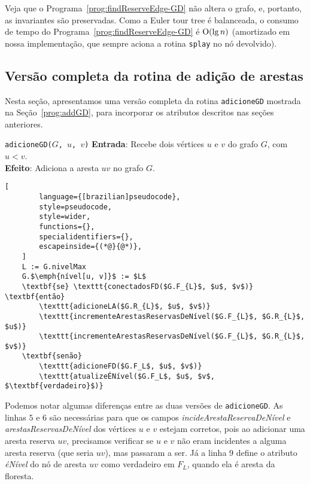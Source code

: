 Veja que o Programa~\ref{prog:findReserveEdge-GD} não altera o grafo, e, portanto, as invariantes são preservadas. Como a Euler tour tree é balanceada, o consumo de tempo do Programa~\ref{prog:findReserveEdge-GD} é $\mathrm{O}(\lg n)$ (amortizado em nossa implementação, que sempre aciona a rotina \texttt{splay} no nó devolvido).

\subsection{Versão completa da rotina de adição de arestas}
\label{sec:code-edge-addition-second-version}

Nesta seção, apresentamos uma versão completa da rotina \texttt{adicioneGD} mostrada na Seção~\ref{prog:addGD}, para incorporar os atributos descritos nas seções anteriores.

\begin{programruledcaption}{\texttt{adicioneGD($G$, $u$, $v$)} \label{prog:addGD-version2}}
    \noindent\textbf{Entrada}: Recebe dois vértices $u$ e $v$ do grafo $G$, com $u < v$. \\
    \textbf{Efeito}: Adiciona a aresta $uv$ no grafo $G$.
    \vspace{-0.5\baselineskip}
    \begin{lstlisting}[
        language={[brazilian]pseudocode},
        style=pseudocode,
        style=wider,
        functions={},
        specialidentifiers={},
        escapeinside={(*@}{@*)},
    ]
    L := G.nivelMax
    G.$\emph{nível[u, v]}$ := $L$
    \textbf{se} \texttt{conectadosFD($G.F_{L}$, $u$, $v$)} \textbf{então}
        \texttt{adicioneLA($G.R_{L}$, $u$, $v$)}
        \texttt{incrementeArestasReservasDeNível($G.F_{L}$, $G.R_{L}$, $u$)}
        \texttt{incrementeArestasReservasDeNível($G.F_{L}$, $G.R_{L}$, $v$)}
    \textbf{senão}
        \texttt{adicioneFD($G.F_L$, $u$, $v$)}
        \texttt{atualizeÉNível($G.F_L$, $u$, $v$, $\textbf{verdadeiro}$)}
    \end{lstlisting}
    \vspace{-0.5\baselineskip}
\end{programruledcaption}

Podemos notar algumas diferenças entre as duas versões de \texttt{adicioneGD}. As linhas $5$ e $6$ são necessárias para que os campos \textit {incideArestaReservaDeNível} e \textit{arestasReservasDeNível} dos vértices $u$ e $v$ estejam corretos, pois ao adicionar uma aresta reserva $uv$, precisamos verificar se $u$ e $v$ não eram incidentes a alguma aresta reserva (que seria $uv$), mas passaram a ser. Já a linha $9$ define o atributo \textit{éNível} do nó de aresta $uv$ como verdadeiro em $F_L$, quando ela é aresta da floresta. 

